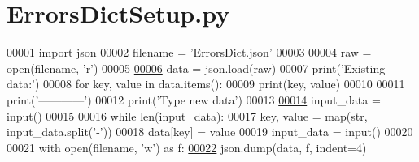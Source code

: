 \hypertarget{_errors_dict_setup_8py_source}{}\section{Errors\+Dict\+Setup.\+py}
\label{_errors_dict_setup_8py_source}

\begin{DoxyCode}
\hypertarget{_errors_dict_setup_8py_source.tex_l00001}{}\hyperlink{namespace_errors_dict_setup}{00001} \textcolor{keyword}{import} json
\hypertarget{_errors_dict_setup_8py_source.tex_l00002}{}\hyperlink{namespace_errors_dict_setup_a0c97c48fca0fdec3e730b9df1dbab9c7}{00002} filename = \textcolor{stringliteral}{'ErrorsDict.json'}
00003 
\hypertarget{_errors_dict_setup_8py_source.tex_l00004}{}\hyperlink{namespace_errors_dict_setup_a71f324cc110ab41d2a588f590fff7481}{00004} raw = open(filename, \textcolor{stringliteral}{'r')}
00005 \textcolor{stringliteral}{}
\hypertarget{_errors_dict_setup_8py_source.tex_l00006}{}\hyperlink{namespace_errors_dict_setup_af570460846fb9f0c91abd308a095dcdc}{00006} \textcolor{stringliteral}{data = json.load(raw)}
00007 \textcolor{stringliteral}{print('Existing data:'})
00008 \textcolor{keywordflow}{for} key, value \textcolor{keywordflow}{in} data.items():
00009     print(key, value)
00010 
00011 print(\textcolor{stringliteral}{'------------'})
00012 print(\textcolor{stringliteral}{'Type new data'})
00013 
\hypertarget{_errors_dict_setup_8py_source.tex_l00014}{}\hyperlink{namespace_errors_dict_setup_a82a4de99ebada6605cb7ca0598ef411e}{00014} input\_data = input()
00015 
00016 \textcolor{keywordflow}{while} len(input\_data):
\hypertarget{_errors_dict_setup_8py_source.tex_l00017}{}\hyperlink{namespace_errors_dict_setup_a4436d6af623cbe45d37493afe4de9461}{00017}     key, value = map(str, input\_data.split(\textcolor{stringliteral}{'-'}))
00018     data[key] = value
00019     input\_data = input()
00020 
00021 with open(filename, \textcolor{stringliteral}{'w'}) \textcolor{keyword}{as} f:
\hypertarget{_errors_dict_setup_8py_source.tex_l00022}{}\hyperlink{namespace_errors_dict_setup_a3c8f88b66a58f9c28e5d3bd66fa6191a}{00022}     json.dump(data, f, indent=4)
\end{DoxyCode}
